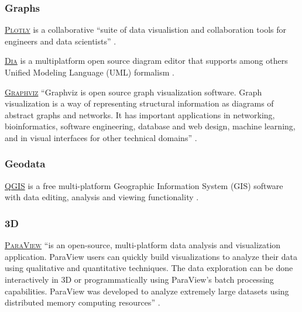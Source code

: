 \subsubsection{Graphs}

\noindent {} \textsc{\href{https://plot.ly}{Plotly}} is a collaborative ``suite of data visualistion and collaboration tools for engineers and data scientists'' \cite{plot.ly_plotly_2015}.

\vspace{0.4cm}

\noindent {} \textsc{\href{https://wiki.gnome.org/Apps/Dia/}{Dia}} is a multiplatform open source diagram editor that supports among others Unified Modeling Language (UML) formalism \cite{gnu_dia_2015}.

\vspace{0.4cm}

\noindent {} \textsc{\href{http://www.graphviz.org/}{Graphviz}} ``Graphviz is open source graph visualization software. Graph visualization is a way of representing structural information as diagrams of abstract graphs and networks. It has important applications in networking, bioinformatics,  software engineering, database and web design, machine learning, and in visual interfaces for other technical domains'' \cite{graphviz_graph_2015}.

\subsubsection{Geodata}

\noindent {} \textsc{\href{http://www.qgis.org/en/site/}{QGIS}} is a free multi-platform Geographic Information System (GIS) software with data editing, analysis and viewing functionality \cite{qgis.org_qgis_2015}.

\subsubsection{3D} 

\noindent {} \textsc{\href{http://www.paraview.org/}{ParaView}}  ``is an open-source, multi-platform data analysis and visualization application. ParaView users can quickly build visualizations to analyze their data using qualitative and quantitative techniques. The data exploration can be done interactively in 3D or programmatically using ParaView’s batch processing capabilities. ParaView was developed to analyze extremely large datasets using distributed memory computing resources'' \cite{paraview.org_paraview_2015}.

